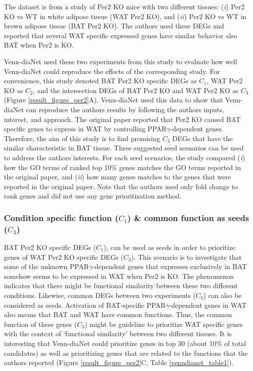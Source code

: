 \documentclass[oneside,phd]{snuthesis}
\begin{document}
The dataset is from a study of Per2 KO mice with two different tissues: (\textit{i}) Per2 KO vs WT in white adipose tissue (WAT Per2 KO), and (\textit{ii}) Per2 KO vs WT in brown adipose tissue (BAT Per2 KO).
The authors used these DEGs and reported that several WAT specific expressed genes have similar behavior also BAT when Per2 is KO.

Venn-diaNet used these two experiments from this study to evaluate how well Venn-diaNet could reproduce the effects of the corresponding study. 
For convenience, this study denoted BAT Per2 KO specific DEGs as $C_1$, WAT Per2 KO as $C_2$, and the intersection DEGs of BAT Per2 KO and WAT Per2 KO as $C_3$ (Figure \ref{result_figure_per2}A).
Venn-diaNet used this data to show that Venn-diaNet can reproduce the authors results by following the authors inputs, interest, and approach. 
The original paper reported that Per2 KO caused BAT specific genes to express in WAT by controlling PPAR$\gamma$-dependent genes.
Therefore, the aim of this study is to find promising $C_2$ DEGs that have the similar characteristic in BAT tissue.
Three suggested seed scenarios can be used to address the authors interests.
For each seed scenarios, the study compared (\textit{i}) how the GO terms of ranked top 10\% genes matches the GO terms reported in the original paper, and (\textit{ii}) 
how many genes matches to the genes that were reported in the original paper.
Note that the authors used only fold change to rank genes and did not use any gene prioritization method.

\subsubsection{Condition specific function ($C_1$) \& common function as seeds ($C_3$)} 
BAT Per2 KO specific DEGs ($C_1$), can be used as seeds in order to prioritize genes of WAT Per2 KO specific DEGs ($C_2$). 
This scenario is to investigate that some of the unknown PPAR$\gamma$-dependent genes that expresses exclusively in BAT somehow seems to be expressed in WAT when Per2 is KO.
The phenomenon indicates that there might be functional similarity between these two different conditions. Likewise, common DEGs between two experiments ($C_3$) can also be considered as seeds. 
Activation of BAT-specific PPAR$\gamma$-dependent genes in WAT also means that BAT and WAT have common functions. Thus, the common function of these genes ($C_3$) might be guideline  to prioritize WAT specific genes with the context of `functional similarity' between two different tissues.
It is interesting that Venn-diaNet could prioritize genes in top 30 (about 10\% of total candidates) as well as prioritizing genes that are related to the functions that the authors reported (Figure \ref{result_figure_per2}C, Table \ref{venndianet_table1}).
\end{document}
